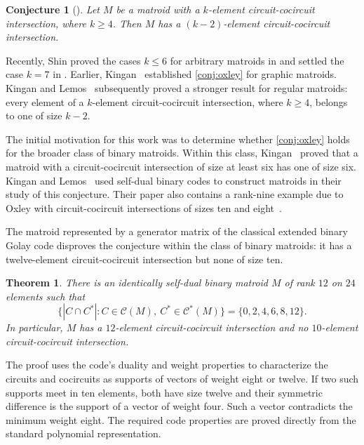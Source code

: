 \documentclass[11pt]{article}
\numberwithin{equation}{section}
\newtheorem{theorem}{Theorem}[section]
\newtheorem{conjecture}[conjecture]{Conjecture}
\begin{document}
\begin{conjecture}[{\cite[Conjecture~15.9.5]{Oxley2011}}]
\label{conj:oxley}
Let $M$ be a matroid with a $k$-element circuit-cocircuit intersection,
where $k\geq4$.
Then $M$ has a $(k-2)$-element circuit-cocircuit intersection.
\end{conjecture}

Recently, Shin proved the cases $k\leq6$ for arbitrary matroids
in \cite[Theorem~2.2]{Shin2021} and settled the case $k=7$
in \cite[Theorem~2.7]{Shin2023}.
Earlier, Kingan~\cite[Theorem~4.2]{Kingan1999} established
\autoref{conj:oxley} for graphic matroids.
Kingan and Lemos~\cite[Corollary~1.2]{KinganLemos2006} subsequently proved
a stronger result for regular matroids: every element of a $k$-element
circuit-cocircuit intersection, where $k\geq4$, belongs to one of size $k-2$.

The initial motivation for this work was to determine whether
\autoref{conj:oxley} holds for the broader class of binary matroids.
Within this class, Kingan~\cite[Theorem~2.3]{Kingan1999} proved that a matroid
with a circuit-cocircuit intersection of size at least six has one of size six.
Kingan and Lemos~\cite[pp.~472--473]{KinganLemos2006} used self-dual
binary codes to construct matroids in their study of this conjecture.
Their paper also contains a rank-nine example due to Oxley with circuit-cocircuit
intersections of sizes ten and eight~\cite[pp.~473, 480]{KinganLemos2006}.

The matroid represented by a generator matrix of the classical extended
binary Golay code disproves the conjecture within the class of binary
matroids: it has a twelve-element circuit-cocircuit intersection but none
of size ten.

\begin{theorem}\label{thm:main}
There is an identically self-dual binary matroid $M$ of rank $12$ on $24$
elements such that
\[
 \bigl\{|C\cap C^*|:
 C\in\mathcal C(M),\ C^*\in\mathcal C^*(M)\bigr\}
 =\{0,2,4,6,8,12\}.
\]
In particular, $M$ has a $12$-element circuit-cocircuit intersection and
no $10$-element circuit-cocircuit intersection.
\end{theorem}

The proof uses the code's duality and weight properties to characterize
the circuits and cocircuits as supports of vectors of weight eight or twelve.
If two such supports meet in ten elements, both have size twelve and their
symmetric difference is the support of a vector of weight four. Such a
vector contradicts the minimum weight eight. The required code properties
are proved directly from the standard polynomial representation.
\end{document}

